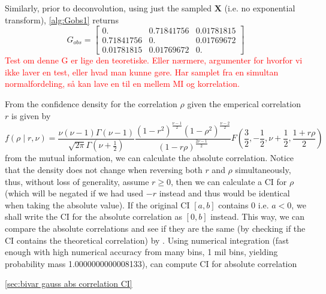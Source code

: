 \documentclass[../Thesis.tex]{subfiles}
\begin{document}
Similarly, prior to deconvolution, using just the sampled $\boldsymbol X$ (i.e. no exponential transform), \autoref{alg:Gobs1} returns
$$G_{obs} =
    \begin{bmatrix}
        0.         & 0.71841756 & 0.01781815 \\
        0.71841756 & 0.         & 0.01769672 \\
        0.01781815 & 0.01769672 & 0.
    \end{bmatrix}
$$
\textcolor{red}{Test om denne G er lige den teoretiske. Eller nærmere, argumenter for hvorfor vi ikke laver en test, eller hvad man kunne gøre. Har samplet fra en simultan normalfordeling, så kan lave en til en mellem MI og korrelation. }

From the confidence density for the correlation $\rho$ given the emperical correlation $r$ is given by
$$f\left(\rho \mid r,\nu\right) = \frac{\nu (\nu-1) \Gamma(\nu-1)}{\sqrt{2\pi} \Gamma(\nu + \frac{1}{2})} \frac{\left(1-r^2\right)^{\frac{\nu-1}{2}} \left(1-\rho^2\right)^{\frac{\nu-2}{2}} }{\left(1-r\rho\right)^{\frac{2\nu-1}{2}}} F\left(\frac{3}{2}, -\frac{1}{2}, \nu+\frac{1}{2}, \frac{1+r\rho}{2}\right)$$
from the mutual information, we can calculate the absolute correlation. Notice that the density does not change when reversing both $r$ and $\rho$ simultaneously, thus, without loss of generality, assume $r\geq 0$, then we can calculate a CI for $\rho$ (which will be negated if we had used $-r$ instead and thus would be identical when taking the absolute value). If the original CI $[a,b]$ contains $0$ i.e. $a<0$, we shall write the CI for the absolute correlation as $[0,b]$ instead. This way, we can compare the absolute correlations and see if they are the same (by checking if the CI contains the theoretical correlation) by \cite{Confidence_in_Correlation}. Using numerical integration (fast enough with high numerical accuracy from many bins, 1 mil bins, yielding probability mass 1.0000000000008133), can compute CI for absolute correlation

\autoref{sec:bivar gauss abs correlation CI}
\end{document}

